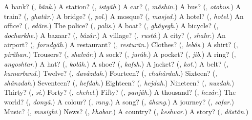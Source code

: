 \begin{tcolorbox}[breakable,colback=teal!4,colframe=teal!35!black,title={Before you move on}]
A bank? (\textbf{}, \emph{bânk}.) A station? (\textbf{}, \emph{istgâh}.) A car? (\textbf{}, \emph{mâshin}.) A bus? (\textbf{}, \emph{otobus}.) A train? (\textbf{}, \emph{ghatâr}.) A bridge? (\textbf{}, \emph{pol}.) A mosque? (\textbf{}, \emph{masjed}.) A hotel? (\textbf{}, \emph{hotel}.) An office? (\textbf{}, \emph{edâre}.) The police? (\textbf{}, \emph{polis}.) A boat? (\textbf{}, \emph{ghâyegh}.) A bicycle? (\textbf{}, \emph{docharkhe}.) A bazaar? (\textbf{}, \emph{bâzâr}.) A village? (\textbf{}, \emph{rustâ}.) A city? (\textbf{}, \emph{shahr}.) An airport? (\textbf{}, \emph{forudgâh}.) A restaurant? (\textbf{}, \emph{resturân}.) Clothes? (\textbf{}, \emph{lebâs}.) A shirt? (\textbf{}, \emph{pirâhan}.) Trousers? (\textbf{}, \emph{shalvâr}.) A sock? (\textbf{}, \emph{jurâb}.) A pocket? (\textbf{}, \emph{jib}.) A ring? (\textbf{}, \emph{angoshtar}.) A hat? (\textbf{}, \emph{kolâh}.) A shoe? (\textbf{}, \emph{kafsh}.) A jacket? (\textbf{}, \emph{kot}.) A belt? (\textbf{}, \emph{kamarband}.) Twelve? (\textbf{}, \emph{davâzdah}.) Fourteen? (\textbf{}, \emph{chahârdah}.) Sixteen? (\textbf{}, \emph{shânzdah}.) Seventeen? (\textbf{}, \emph{hefdah}.) Eighteen? (\textbf{}, \emph{hejdah}.) Nineteen? (\textbf{}, \emph{nuzdah}.) Thirty? (\textbf{}, \emph{si}.) Forty? (\textbf{}, \emph{chehel}.) Fifty? (\textbf{}, \emph{panjâh}.) A thousand? (\textbf{}, \emph{hezâr}.) The world? (\textbf{}, \emph{donyâ}.) A colour? (\textbf{}, \emph{rang}.) A song? (\textbf{}, \emph{âhang}.) A journey? (\textbf{}, \emph{safar}.) Music? (\textbf{}, \emph{musighi}.) News? (\textbf{}, \emph{khabar}.) A country? (\textbf{}, \emph{keshvar}.) A story? (\textbf{}, \emph{dâstân}.)
\end{tcolorbox}
